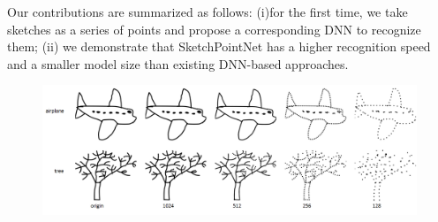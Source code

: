 Our contributions are summarized as follows: (i)for the first time, we take sketches as a series of points and propose a corresponding DNN to recognize them; (ii) we demonstrate that SketchPointNet has a higher recognition speed and a smaller model size than existing DNN-based approaches.

\begin{figure}
    \center
    \includegraphics[width=6.5in]{images/resample.png}
    \label{fig:resample}
\end{figure}
